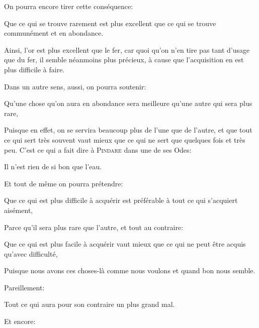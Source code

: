 \bigbreak

On pourra encore tirer cette conséquence:

\begin{lieu}
	Que ce qui se trouve rarement est plus excellent que ce qui se trouve communément et en abondance.
\end{lieu}

Ainsi, l'or est plus excellent que le fer, car quoi qu'on n'en tire pas tant d'usage que du fer, il semble néanmoins plus
précieux, à cause que l'acquisition en est plus difficile à faire.

Dans un autre sens, aussi, on pourra soutenir:

\begin{lieu}
	Qu'une chose qu'on aura en abondance sera meilleure qu'une autre qui sera plus rare,
\end{lieu}

Puisque en effet, on se servira beaucoup plus de l'une que de l'autre, et que tout ce qui sert très souvent vaut mieux que
ce qui ne sert que quelques fois et très peu. C'est ce qui a fait dire à \textsc{Pindare} dans une de ses Odes:

\begin{emphpar}
	Il n'est rien de si bon que l'eau.
\end{emphpar}

\bigbreak

Et tout de même on pourra prétendre:

\begin{lieu}
	Que ce qui est plus difficile à acquérir est préférable à tout ce qui s'acquiert aisément,
\end{lieu}

Parce qu'il sera plus rare que l'autre, et tout au contraire:

\begin{lieu}
	Que ce qui est plus facile à acquérir vaut mieux que ce qui ne peut être acquis qu'avec difficulté,
\end{lieu}

Puisque nous avons ces choses-là comme nous voulons et quand bon nous semble.

\bigbreak

Pareillement:

\begin{lieu}
	Tout ce qui aura pour son contraire un plus grand mal.
\end{lieu}

\bigbreak

Et encore:

